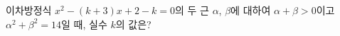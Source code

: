 이차방정식 $x^2-(k+3)x+2-k=0$의 두 근 $\alpha$, $\beta$에 대하여 $\alpha+\beta>0$이고 $\alpha^2+\beta^2=14$일 때, 실수 $k$의 값은?
